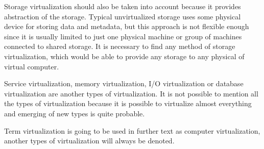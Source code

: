Storage virtualization should also be taken into account because it provides abstraction of the storage. Typical unvirtualized storage uses some physical device for storing data and metadata, but this approach is not flexible enough since it is usually limited to just one physical machine or group of machines connected to shared storage. It is necessary to find any method of storage virtualization, which would be able to provide any storage to any physical of virtual computer.

Service virtualization, memory virtualization, I/O virtualization or database virtualization are another types of virtualization. It is not possible to mention all the types of virtualization because it is possible to virtualize almost everything and emerging of new types is quite probable. 

Term virtualization is going to be used in further text as computer virtualization, another types of virtualization will always be denoted.

